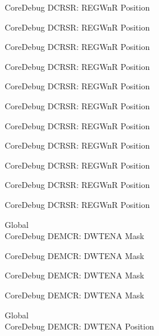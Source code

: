 \begin{DoxyRefList}
\label{deprecated__deprecated000403}%
%
Core\+Debug DCRSR\+: REGWnR Position 

\label{deprecated__deprecated000492}%
%
Core\+Debug DCRSR\+: REGWnR Position 

\label{deprecated__deprecated000594}%
%
Core\+Debug DCRSR\+: REGWnR Position 

\label{deprecated__deprecated000719}%
%
Core\+Debug DCRSR\+: REGWnR Position 

\label{deprecated__deprecated000807}%
%
Core\+Debug DCRSR\+: REGWnR Position 

\label{deprecated__deprecated000863}%
%
Core\+Debug DCRSR\+: REGWnR Position 

\label{deprecated__deprecated000946}%
%
Core\+Debug DCRSR\+: REGWnR Position 

\label{deprecated__deprecated001005}%
%
Core\+Debug DCRSR\+: REGWnR Position 

\label{deprecated__deprecated001081}%
%
Core\+Debug DCRSR\+: REGWnR Position 

\label{deprecated__deprecated001170}%
%
Core\+Debug DCRSR\+: REGWnR Position 

\label{deprecated__deprecated001272}%
%
Core\+Debug DCRSR\+: REGWnR Position  
\item[Global \doxylink{group___c_m_s_i_s___core_debug_ga2fcc0b8f174e85379d38e1cb74b8c627}{Core\+Debug\+\_\+\+DEMCR\+\_\+\+DWTENA\+\_\+\+Msk} ]\hfill \\
\label{deprecated__deprecated000134}%
%
Core\+Debug DEMCR\+: DWTENA Mask 

\label{deprecated__deprecated000273}%
%
Core\+Debug DEMCR\+: DWTENA Mask 

\label{deprecated__deprecated000812}%
%
Core\+Debug DEMCR\+: DWTENA Mask 

\label{deprecated__deprecated000951}%
%
Core\+Debug DEMCR\+: DWTENA Mask  
\item[Global \doxylink{group___c_m_s_i_s___core_debug_ga0cde79c4e741e1eed0513c1f985baeb9}{Core\+Debug\+\_\+\+DEMCR\+\_\+\+DWTENA\+\_\+\+Pos} ]\hfill \\
\label{deprecated__deprecated000133}%
%
Core\+Debug DEMCR\+: DWTENA Position 


\end{DoxyRefList}
